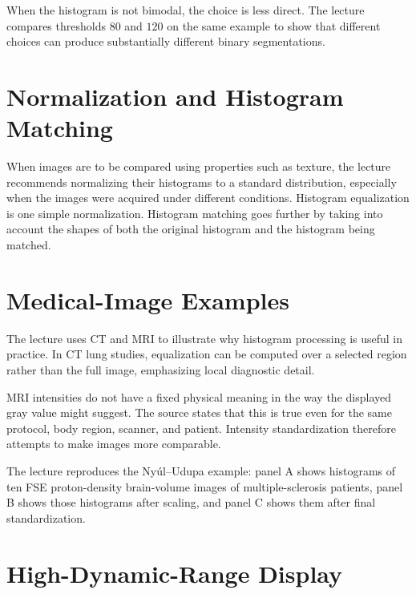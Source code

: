 \documentclass[11pt,a4paper,oneside]{report}
\begin{document}
When the histogram is not bimodal, the choice is less direct. The lecture compares thresholds $80$ and $120$ on the same example to show that different choices can produce substantially different binary segmentations.



\section{Normalization and Histogram Matching}

When images are to be compared using properties such as texture, the lecture recommends normalizing their histograms to a standard distribution, especially when the images were acquired under different conditions. Histogram equalization is one simple normalization. Histogram matching goes further by taking into account the shapes of both the original histogram and the histogram being matched.

\section{Medical-Image Examples}

The lecture uses CT and MRI to illustrate why histogram processing is useful in practice. In CT lung studies, equalization can be computed over a selected region rather than the full image, emphasizing local diagnostic detail.



MRI intensities do not have a fixed physical meaning in the way the displayed gray value might suggest. The source states that this is true even for the same protocol, body region, scanner, and patient. Intensity standardization therefore attempts to make images more comparable.

The lecture reproduces the Ny\'ul--Udupa example: panel A shows histograms of ten FSE proton-density brain-volume images of multiple-sclerosis patients, panel B shows those histograms after scaling, and panel C shows them after final standardization.



\section{High-Dynamic-Range Display}
\end{document}
